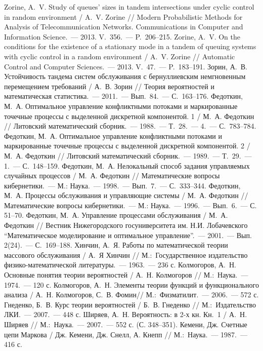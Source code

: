 \documentclass[a4paper,12pt,russian]{extarticle}
\newcommand{\No}{\textnumero}
\begin{document}
\begin{thebibliography}{99}
 Zorine, A.~V. Study of queues’ sizes in tandem intersections under cyclic control in random environment /  A.~V. Zorine // Modern Probabilistic Methods for Analysis of Telecommunication Networks. Communications in Computer and Information Science.~--- 2013. V.~356.~--- P.~206--215.
 Zorine, A.~V. On the conditions for the existence of a stationary mode in a tandem of queuing systems with cyclic control in a random environment / A.~V. Zorine // Automatic Control and Computer Sciences.~--- 2013. V.~47.~--- P.~183--191.
 Зорин, А.~В. Устойчивость тандема систем обслуживания с бернуллиевским немгновенным перемещением требований / А.~В. Зорин // Теория вероятностей и математическая статистика.~--- 2011.~--- Вып.~84.~--- С.~163--176.
 Федоткин, М.~А. Оптимальное управление конфликтными потоками и маркированные точечные процессы с выделенной дискретной компонентой. 1 / М.~А. Федоткин // Литовский математический сборник.~--- 1988.~--- Т.~28.~--- \No {} 4.~--- С.~783--784.
 Федоткин, М.~А. Оптимальное управление конфликтными потоками и маркированные точечные процессы с выделенной дискретной компонентой. 2 / М.~А. Федоткин // Литовский математический сборник.~--- 1989.~--- Т.~29.~--- \No {} 1.~--- С.~148--159.
 Федоткин, М.~А. Нелокальный способ задания управляемых случайных процессов / М.~А. Федоткин // Математические вопросы кибернетики.~--- М.: Наука.~--- 1998.~--- Вып.~7.~--- С.~333--344.
 Федоткин, М.~А. Процессы обслуживания и управляющие системы / М.~А. Федоткин // Математические вопросы кибернетики.~--- М.: Наука.~--- 1996.~--- Вып.~6.~--- С. 51--70.
 Федоткин, М.~А. Управление процессами обслуживания / М.~А. Федоткин // Вестник Нижегородского госуниверситета им. Н.И. Лобачевского “Математическое моделирование и оптимальное управление”.~--- 2001.~--- Вып. 2(24).~--- С.~169--188.
 Хинчин, А.~Я. Работы по математической теории массового обслуживания / А.~Я Хинчин // М.:~Государственное издательство физико-математической литературы.~--- 1963.~--- 236 с.
 Колмогоров, А.~Н. Основные понятия теории вероятностей / А.~Н. Колмогоров // М.:~Наука.~--- 1974.~--- 120 с.
 Колмогоров, А.~Н. Элементы теории функций и функционального анализа / А.~Н. Колмогоров, С.~В. Фомин// М.:~Физматилит.~--- 2006.~--- 572 с.
 Гнеденко, Б.~В. Курс теории вероятностей / Б.~В. Гнеденко // М.:~Издательство ЛКИ.~--- 2007.~--- 448 с.
 Ширяев, А.~Н. Вероятность: в 2-х кн. Кн.~1 / А.~Н. Ширяев // М.:~Наука.~--- 2007.~--- 552 с. (С. 348--351).
 Кемени, Дж. Счетные цепи Маркова / Дж. Кемени, Дж. Снелл, А. Кнепп // М.:~Наука.~--- 1987.~--- 416 с.
\end{thebibliography}
\end{document}
